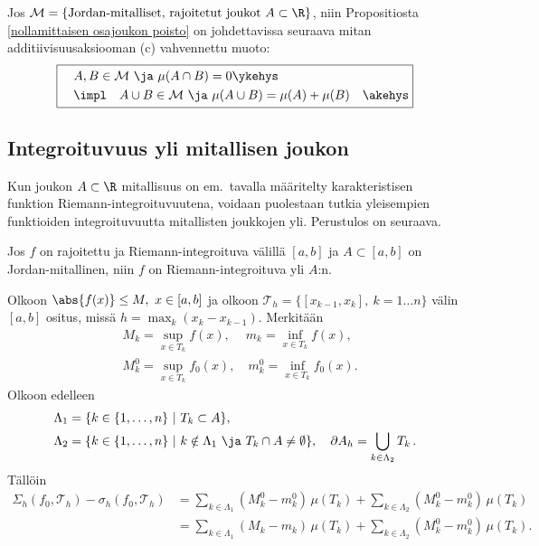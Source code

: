 Jos $\mathcal{M}=\{\text{Jordan-mitalliset, rajoitetut joukot } A\subset\R\}$, niin 
Propositiosta \ref{nollamittaisen osajoukon poisto} on johdettavissa seuraava mitan 
additiivisuusaksiooman (c) vahvennettu muoto:
\[
\boxed{ \begin{aligned}
        \quad &A,B\in\mathcal{M} \ \ja \ \mu(A\cap B)=0 \ykehys\\
              &\impl\quad A\cup B\in\mathcal{M}\ \ja\ \mu(A\cup B)=\mu(A)+\mu(B) \quad\akehys
        \end{aligned} }
\]

\subsection*{Integroituvuus yli mitallisen joukon}

Kun joukon $A\subset\R$ mitallisuus on em.\ tavalla määritelty karakteristisen funktion 
Riemann-integroituvuutena, voidaan puolestaan tutkia yleisempien funktioiden integroituvuutta
mitallisten joukkojen yli. Perustulos on seuraava.
\begin{Lause} \label{integroituvuus yli joukon - R} Jos $f$ on rajoitettu ja 
Riemann-integroituva välillä $[a,b]$ ja $A\subset [a,b]$ on Jordan-mitallinen, niin $f$ on 
Riemann-integroituva yli $A$:n.
\end{Lause}
\tod Olkoon $\abs{f(x)} \le M,\ x\in[a,b]$ ja olkoon
$\mathcal{T}_h=\{[x_{k-1},x_k],\ k=1\ldots n\}$ välin $[a,b]$ ositus, missä
$h=\max_k (x_k-x_{k-1})$. Merkitään
\begin{align*}
&M_k=\sup_{x\in T_k} f(x), \quad\   m_k=\inf_{x\in T_k} f(x), \\
&M_k^0=\sup_{x\in T_k} f_0(x),\quad m_k^0=\inf_{x\in T_k} f_0(x).
\end{align*}
Olkoon edelleen
\begin{align*}
\Lambda_1    &= \{k\in\{1,\ldots,n\} \ | \ T_k\subset A\}, \\
\Lambda_2    &= \{k\in\{1,\ldots,n\} \ | \ k\notin\Lambda_1\ \ja\ T_k\cap A\neq\emptyset\},
                \quad \partial A_h = \bigcup_{k\in\Lambda_2} T_k\,.
\end{align*}
Tällöin
\begin{align*}
\Sigma_h(f_0,\mathcal{T}_h)-\sigma_h(f_0,\mathcal{T}_h)
    &= \sum_{k\in\Lambda_1}(M_k^0-m_k^0)\,\mu(T_k)
     + \sum_{k\in\Lambda_2}(M_k^0-m_k^0)\,\mu(T_k) \\
    &= \sum_{k\in\Lambda_1}(M_k-m_k)\,\mu(T_k)
     + \sum_{k\in\Lambda_2}(M_k^0-m_k^0)\,\mu(T_k).
\end{align*}
